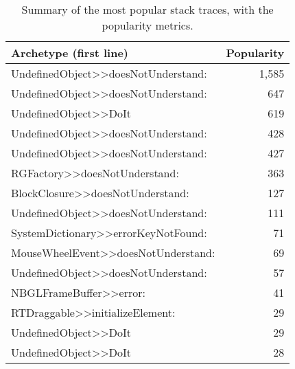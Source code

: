 \begin{table}[ht]
\caption{Summary of the most popular stack traces, with the popularity metrics.}
\begin{center}
\begin{tabular}{lr}
\rowcolor{tableheader}\textbf{Archetype (first line)} & \textbf{Popularity} \\ \hline
UndefinedObject>>doesNotUnderstand: & 1,585 \\
UndefinedObject>>doesNotUnderstand: & 647 \\
UndefinedObject>>DoIt & 619 \\
UndefinedObject>>doesNotUnderstand: & 428 \\
UndefinedObject>>doesNotUnderstand: & 427 \\
RGFactory>>doesNotUnderstand: & 363 \\
BlockClosure>>doesNotUnderstand: & 127 \\
UndefinedObject>>doesNotUnderstand: & 111 \\
SystemDictionary>>errorKeyNotFound: & 71 \\
MouseWheelEvent>>doesNotUnderstand: & 69 \\
UndefinedObject>>doesNotUnderstand: & 57 \\
NBGLFrameBuffer>>error: & 41 \\
RTDraggable>>initializeElement: & 29 \\
UndefinedObject>>DoIt & 29 \\
UndefinedObject>>DoIt & 28 \\
\hline
\end{tabular}
\label{tab:popularity}
\end{center}
\end{table}


